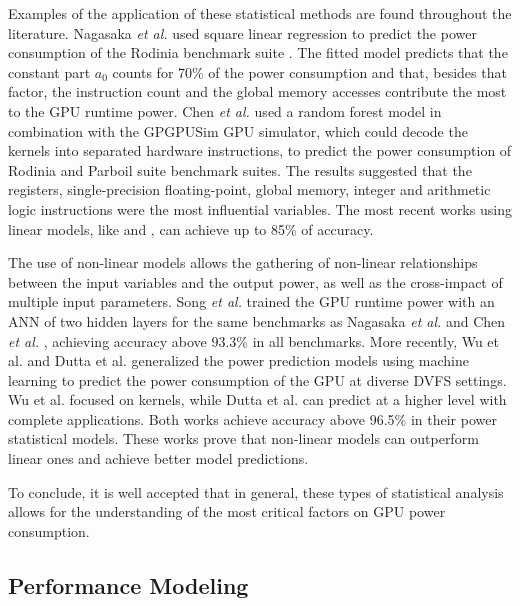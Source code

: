 Examples of the application of these statistical methods are found throughout the literature. Nagasaka \textit{et al.} \cite{nagasaka_statistical_2010} used square linear regression to predict the power consumption of the Rodinia benchmark suite \cite{che_rodinia:_2009}. The fitted model predicts that the constant part $a_0$ counts for 70\% of the power consumption and that, besides that factor, the instruction count and the global memory accesses contribute the most to the GPU runtime power.  Chen \textit{et al.} \cite{chen_statistical_2011} used a random forest model in combination with the GPGPUSim GPU simulator, which could decode the kernels into separated hardware instructions, to predict the power consumption of Rodinia \cite{che_rodinia:_2009} and Parboil suite \cite{stratton_parboil:_nodate} benchmark suites. The results suggested that the registers, single-precision floating-point, global memory, integer and arithmetic logic instructions were the most influential variables. The most recent works using linear models, like \cite{abe_power_2014} and \cite{ghosh_statistical_2013}, can achieve up to 85\% of accuracy.

The use of non-linear models allows the gathering of non-linear relationships between the input variables and the output power, as well as the cross-impact of multiple input parameters. Song \textit{et al.} \cite{song_simplified_2013} trained the GPU runtime power with an ANN of two hidden layers for the same benchmarks as Nagasaka \textit{et al.} \cite{nagasaka_statistical_2010} and Chen \textit{et al.} \cite{chen_statistical_2011}, achieving accuracy above 93.3\% in all benchmarks. More recently, Wu et al. \cite{wu_gpgpu_2015} and Dutta et al. \cite{dutta_gpu_2018} generalized the power prediction models using machine learning to predict the power consumption of the GPU at diverse DVFS settings. Wu et al. focused on kernels, while Dutta et al. can predict at a higher level with complete applications. Both works achieve accuracy above 96.5\% in their power statistical models. These works prove that non-linear models can outperform linear ones and achieve better model predictions.

\bigskip
To conclude, it is well accepted that in general, these types of statistical analysis allows for the understanding of the most critical factors on GPU power consumption.    

\subsection{Performance Modeling}
\label{subsection:performancemodels}

